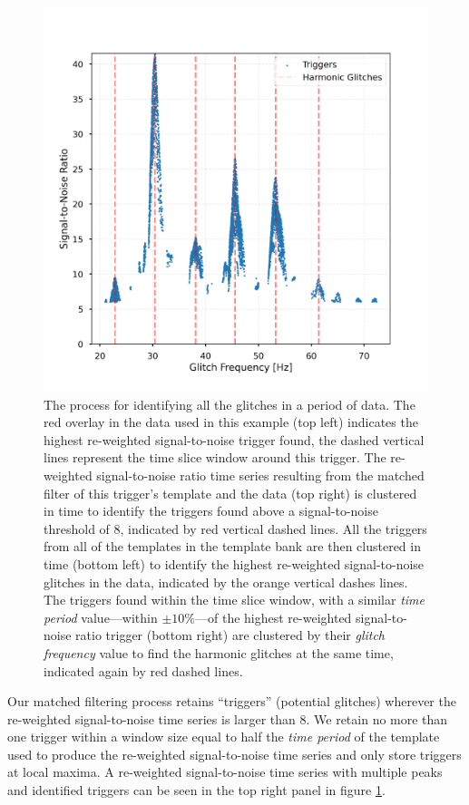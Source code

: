 \begin{figure}
\begin{minipage}[t]{1.0\linewidth}
        \hspace{0.01\linewidth}
        \includegraphics[width=0.49\linewidth]{images/archenemy/Section3/3.5/cluster_in_frequency.pdf}
      \end{minipage}
    \caption{The process for identifying all the \scl{} glitches in a period of \gw{} data. The red overlay in the \gw{} data used in this example (top left) indicates the highest re-weighted signal-to-noise trigger found, the dashed vertical lines represent the time slice window around this trigger. The re-weighted signal-to-noise ratio time series resulting from the matched filter of this trigger's template and the data (top right) is clustered in time to identify the triggers found above a signal-to-noise threshold of $8$, indicated by red vertical dashed lines. All the triggers from all of the templates in the template bank are then clustered in time (bottom left) to identify the highest re-weighted signal-to-noise glitches in the data, indicated by the orange vertical dashes lines. The triggers found within the time slice window, with a similar \emph{time period} value---within $\pm 10\%$---of the highest re-weighted signal-to-noise ratio trigger (bottom right) are clustered by their \emph{glitch frequency} value to find the harmonic glitches at the same time, indicated again by red dashed lines.}
    \label{fig:clustering_story}
\end{figure}

Our matched filtering process retains ``triggers'' (potential \scl{} glitches) wherever the re-weighted signal-to-noise time series is larger than 8. We retain no more than one trigger within a window size equal to half the \emph{time period} of the template used to produce the re-weighted signal-to-noise time series and only store triggers at local maxima. A re-weighted signal-to-noise time series with multiple peaks and identified triggers can be seen in the top right panel in figure \ref{fig:clustering_story}.

